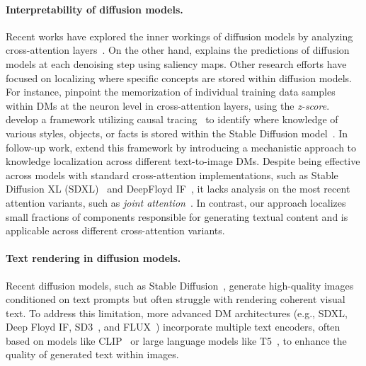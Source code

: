 \paragraph{Interpretability of diffusion models.}
Recent works have explored the inner workings of diffusion models by analyzing cross-attention layers~\citep{tang2022daaminterpretingstablediffusion,hertz2023prompttoprompt}. On the other hand, \citet{park2024explaining} explains the predictions of diffusion models at each denoising step using saliency maps.
Other research efforts have focused on localizing where specific concepts are stored within diffusion models. For instance, \citet{hintersdorf2024finding} pinpoint the memorization of individual training data samples within DMs at the neuron level in cross-attention layers, using the \textit{z-score}. \citet{basu2024-localizing-knowledge} develop a framework utilizing causal tracing~\citep{pearl2001causalTracing} to identify where knowledge of various styles, objects, or facts is stored within the Stable Diffusion model~\citep{rombach2022high}. In follow-up work, \citet{basu2024mechanistic} extend this framework by introducing a mechanistic approach to knowledge localization across different text-to-image DMs. Despite being effective across models with standard cross-attention implementations, such as Stable Diffusion XL (SDXL)~\citep{podell2023sdxl} and DeepFloyd IF~\cite{DeepFloydIF}, it lacks analysis on the most recent attention variants, such as \textit{joint attention}~\citep{esser2024scalingSD3}. In contrast, our approach localizes small fractions of components responsible for generating textual content and is applicable across different cross-attention variants.



\paragraph{Text rendering in diffusion models.}
Recent diffusion models, such as Stable Diffusion~\citep{rombach2022high}, generate high-quality images conditioned on text prompts but often struggle with rendering coherent visual text. To address this limitation, more advanced DM architectures (e.g., SDXL, Deep Floyd IF, SD3~\citep{esser2024scalingSD3}, and FLUX~\citep{flux}) incorporate multiple text encoders, often based on models like CLIP~\citep{clip} or large language models like T5~\citep{raffel2020exploringT5}, to enhance the quality of generated text within images.

